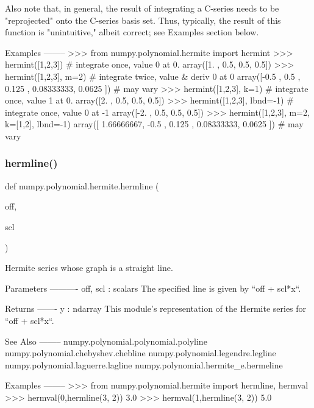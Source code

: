 \begin{DoxyVerb}
Also note that, in general, the result of integrating a C-series needs
to be "reprojected" onto the C-series basis set.  Thus, typically,
the result of this function is "unintuitive," albeit correct; see
Examples section below.

Examples
--------
>>> from numpy.polynomial.hermite import hermint
>>> hermint([1,2,3]) # integrate once, value 0 at 0.
array([1. , 0.5, 0.5, 0.5])
>>> hermint([1,2,3], m=2) # integrate twice, value & deriv 0 at 0
array([-0.5       ,  0.5       ,  0.125     ,  0.08333333,  0.0625    ]) # may vary
>>> hermint([1,2,3], k=1) # integrate once, value 1 at 0.
array([2. , 0.5, 0.5, 0.5])
>>> hermint([1,2,3], lbnd=-1) # integrate once, value 0 at -1
array([-2. ,  0.5,  0.5,  0.5])
>>> hermint([1,2,3], m=2, k=[1,2], lbnd=-1)
array([ 1.66666667, -0.5       ,  0.125     ,  0.08333333,  0.0625    ]) # may vary\end{DoxyVerb}
 \mbox{\label{namespacenumpy_1_1polynomial_1_1hermite_a423e61f5d93b56117ebf5b8e971ab62e}} 
\subsubsection{\texorpdfstring{hermline()}{hermline()}}
{\footnotesize\ttfamily def numpy.\+polynomial.\+hermite.\+hermline (\begin{DoxyParamCaption}\item[{}]{off,  }\item[{}]{scl }\end{DoxyParamCaption})}

\begin{DoxyVerb}Hermite series whose graph is a straight line.



Parameters
----------
off, scl : scalars
    The specified line is given by ``off + scl*x``.

Returns
-------
y : ndarray
    This module's representation of the Hermite series for
    ``off + scl*x``.

See Also
--------
numpy.polynomial.polynomial.polyline
numpy.polynomial.chebyshev.chebline
numpy.polynomial.legendre.legline
numpy.polynomial.laguerre.lagline
numpy.polynomial.hermite_e.hermeline

Examples
--------
>>> from numpy.polynomial.hermite import hermline, hermval
>>> hermval(0,hermline(3, 2))
3.0
>>> hermval(1,hermline(3, 2))
5.0\end{DoxyVerb}
 \mbox{\label{namespacenumpy_1_1polynomial_1_1hermite_a3c0422f4a9d81ccb4789a3518935550a}} 

